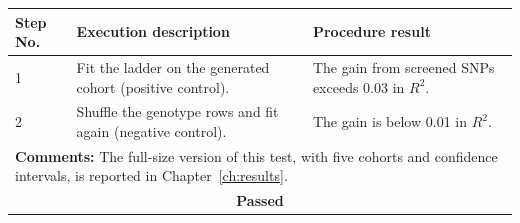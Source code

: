 \begin{table}[H]
\begin{tabular}{|llll|}
\multicolumn{1}{|l|}{\textbf{Step No.}} & \multicolumn{1}{l|}{\textbf{Execution description}} & \multicolumn{2}{l|}{\textbf{Procedure result}} \\ \hline
\multicolumn{1}{|l|}{1} & \multicolumn{1}{P{5.6cm}|}{Fit the ladder on the generated cohort (positive control).} & \multicolumn{2}{P{6.3cm}|}{The gain from screened SNPs exceeds 0.03 in $R^2$.} \\ \hline
\multicolumn{1}{|l|}{2} & \multicolumn{1}{P{5.6cm}|}{Shuffle the genotype rows and fit again (negative control).} & \multicolumn{2}{P{6.3cm}|}{The gain is below 0.01 in $R^2$.} \\ \hline
\multicolumn{4}{|P{15.2cm}|}{\textbf{Comments:} The full-size version of this test, with five cohorts and confidence intervals, is reported in Chapter~\ref{ch:results}.} \\ \hline
\multicolumn{4}{|c|}{\textbf{Passed}} \\ \hline
\end{tabular}
\end{table}

